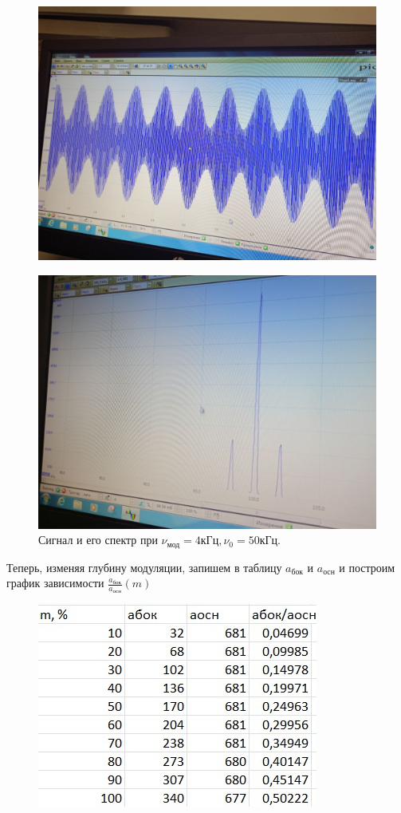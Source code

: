 \documentclass[a4paper,12pt]{article}
\begin{document}
\begin{figure}[H]
\begin{center}
    \includegraphics[width=.5\textwidth]{G.21.3.graph}
\end{center}
\end{figure}

\begin{figure}[H]
\begin{center}
    \includegraphics[width=.5\textwidth]{G.21.3.spectr}
    \caption{Сигнал и его спектр при $\nu_{\text{мод}} = 4 \text{кГц}, \nu_0 = 50 \text{кГц}.$}\label{fig:foobar}
\end{center}
\end{figure}

Теперь, изменяя глубину модуляции, запишем в таблицу $a_\text{бок}$ и $a_\text{осн}$ и построим график зависимости $\frac{a_\text{бок}}{a_\text{осн}}(m)$
\begin{figure}[H]
	\begin{center}
    \includegraphics[width=.6\textwidth]{G.23.tabl}
\label{fig:foobar}
	\end{center}
\end{figure}
\end{document}
